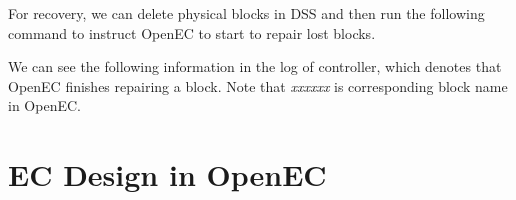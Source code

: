 \documentclass[letterpaper,12pt]{article}
\newcommand{\openec}{{\sf\small OpenEC}\xspace}
\begin{document}
For recovery, we can delete physical blocks in DSS and then run the following command to instruct \openec 
to start to repair lost blocks.

\begin{center}
\noindent{}
\end{center}

We can see the following information in the log of controller, which denotes that \openec finishes repairing a block.
Note that {\sl xxxxxx} is corresponding block name in \openec.

\begin{center}
\noindent{}
\end{center}

\section{EC Design in OpenEC}
\end{document}
